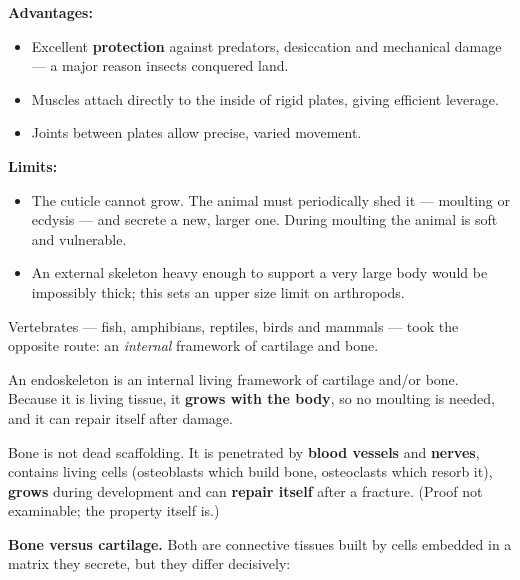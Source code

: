 \documentclass[11pt]{article}
\newcommand{\cle}[1]{{\popxbold\color{popdark}#1}}
\newcounter{popsec}
\newcounter{popsub}
\newcommand{\courssub}[1]{%
  \stepcounter{popsub}%
  \par\vspace{9pt}\noindent{\popxbold\fontsize{11.5}{13}\selectfont\color{popink}{\color{poporange}\thepopsec.\thepopsub}\hspace{6pt}#1}\par\nopagebreak\vspace{4pt}
}
\begin{document}
\textbf{Advantages:}
\begin{itemize}
\item Excellent \textbf{protection} against predators, desiccation and mechanical damage --- a major reason insects conquered land.
\item Muscles attach directly to the inside of rigid plates, giving efficient leverage.
\item Joints between plates allow precise, varied movement.
\end{itemize}

\textbf{Limits:}
\begin{itemize}
\item The cuticle cannot grow. The animal must periodically shed it --- \cle{moulting} or \cle{ecdysis} --- and secrete a new, larger one. During moulting the animal is soft and vulnerable.
\item An external skeleton heavy enough to support a very large body would be impossibly thick; this sets an upper size limit on arthropods.
\end{itemize}

\courssub{Endoskeletons}

Vertebrates --- fish, amphibians, reptiles, birds and mammals --- took the opposite route: an \emph{internal} framework of \cle{cartilage} and \cle{bone}.

\begin{definition}[Endoskeleton]
An \cle{endoskeleton} is an internal living framework of cartilage and/or bone. Because it is living tissue, it \textbf{grows with the body}, so no moulting is needed, and it can repair itself after damage.
\end{definition}

\begin{propriete}
Bone is not dead scaffolding. It is penetrated by \textbf{blood vessels} and \textbf{nerves}, contains living cells (osteoblasts which build bone, osteoclasts which resorb it), \textbf{grows} during development and can \textbf{repair itself} after a fracture. (Proof not examinable; the property itself is.)
\end{propriete}

\textbf{Bone versus cartilage.} Both are connective tissues built by cells embedded in a matrix they secrete, but they differ decisively:
\end{document}
